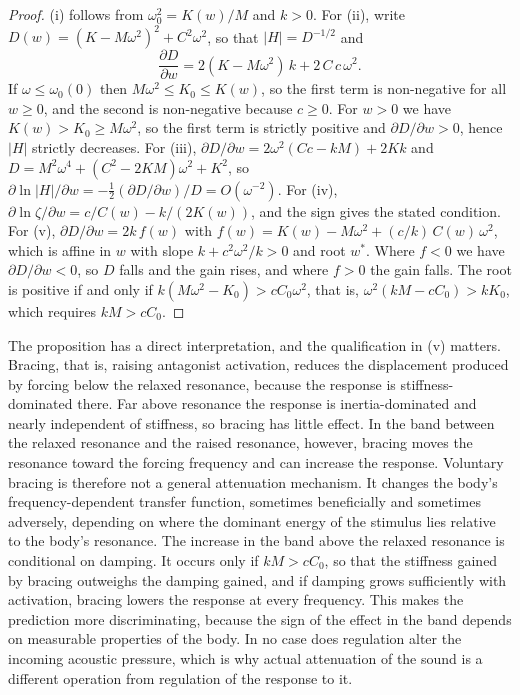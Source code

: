 \documentclass[11pt]{article}
\theoremstyle{plain}
\theoremstyle{definition}
\begin{document}
\begin{proof}
(i) follows from $\omega_0^2=K(w)/M$ and $k>0$. For (ii), write $D(w)=(K-M\omega^2)^2+C^2\omega^2$, so that $|H|=D^{-1/2}$ and
\[
\frac{\partial D}{\partial w} = 2(K-M\omega^2)\,k + 2\,C\,c\,\omega^2 .
\]
If $\omega\le\omega_0(0)$ then $M\omega^2\le K_0\le K(w)$, so the first term is non-negative for all $w\ge 0$, and the second is non-negative because $c\ge 0$. For $w>0$ we have $K(w)>K_0\ge M\omega^2$, so the first term is strictly positive and $\partial D/\partial w>0$, hence $|H|$ strictly decreases. For (iii), $\partial D/\partial w = 2\omega^2(Cc-kM) + 2Kk$ and $D = M^2\omega^4 + (C^2-2KM)\omega^2 + K^2$, so $\partial\ln|H|/\partial w = -\tfrac12 (\partial D/\partial w)/D = O(\omega^{-2})$. For (iv), $\partial\ln\zeta/\partial w = c/C(w) - k/(2K(w))$, and the sign gives the stated condition. For (v), $\partial D/\partial w=2k\,f(w)$ with $f(w)=K(w)-M\omega^2+(c/k)\,C(w)\,\omega^2$, which is affine in $w$ with slope $k+c^2\omega^2/k>0$ and root $w^{\ast}$. Where $f<0$ we have $\partial D/\partial w<0$, so $D$ falls and the gain rises, and where $f>0$ the gain falls. The root is positive if and only if $k(M\omega^2-K_0)>cC_0\omega^2$, that is, $\omega^2(kM-cC_0)>kK_0$, which requires $kM>cC_0$.
\end{proof}

The proposition has a direct interpretation, and the qualification in (v) matters. Bracing, that is, raising antagonist activation, reduces the displacement produced by forcing below the relaxed resonance, because the response is stiffness-dominated there. Far above resonance the response is inertia-dominated and nearly independent of stiffness, so bracing has little effect. In the band between the relaxed resonance and the raised resonance, however, bracing moves the resonance toward the forcing frequency and can increase the response. Voluntary bracing is therefore not a general attenuation mechanism. It changes the body's frequency-dependent transfer function, sometimes beneficially and sometimes adversely, depending on where the dominant energy of the stimulus lies relative to the body's resonance. The increase in the band above the relaxed resonance is conditional on damping. It occurs only if $kM>cC_0$, so that the stiffness gained by bracing outweighs the damping gained, and if damping grows sufficiently with activation, bracing lowers the response at every frequency. This makes the prediction more discriminating, because the sign of the effect in the band depends on measurable properties of the body. In no case does regulation alter the incoming acoustic pressure, which is why actual attenuation of the sound is a different operation from regulation of the response to it.
\end{document}
